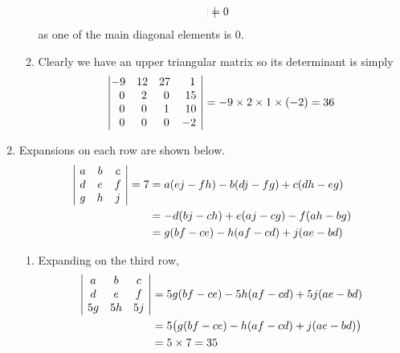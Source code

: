 \documentclass[12pt]{amsart}
\begin{document}
\begin{enumerate}
\begin{enumerate}
\begin{align}
\begin{vmatrix}
				\end{vmatrix} =0 \notag
			\end{align}
			as one of the main diagonal elements is $0$.
			\medskip
			\item Clearly we have an upper triangular matrix so its determinant is simply
			\begin{align}
				\begin{vmatrix}
					-9 &12 &27 &\text{ } \text{ }1 \text{ } \\
					\text{ } \text{ }0 &\text{ }2 &\text{ }0 &\text{ }15 \text{ } \\
					\text{ } \text{ }0 &\text{ }0 &\text{ }1 &\text{ }10 \text{ } \\
					\text{ } \text{ }0 &\text{ }0 &\text{ }0 &-2 \text{ }
				\end{vmatrix}=-9\times2\times1\times(-2)=36 \notag
			\end{align}
			
		\end{enumerate}
		
	\item Expansions on each row are shown below.
			\begin{align}
				\begin{vmatrix}
					\text{ }a &b &c \text{ } \\
					\text{ }d &e &f \text{ } \\
					\text{ }g &h &j \text{ }
				\end{vmatrix}=7
				&=a(ej-fh)-b(dj-fg)+c(dh-eg) \notag \\
				&=-d(bj-ch)+e(aj-cg)-f(ah-bg) \notag \\
				&=g(bf-ce)-h(af-cd)+j(ae-bd) \notag
			\end{align}

		\begin{enumerate}
		
			\item Expanding on the third row,
			\begin{align}
				\begin{vmatrix}
					\text{ }a &b &c \text{ } \\
					\text{ }d &e &f \text{ } \\
					\text{ }5g &5h &5j \text{ }
				\end{vmatrix}&=5g(bf-ce)-5h(af-cd)+5j(ae-bd) \notag \\
				&=5\big(g(bf-ce)-h(af-cd)+j(ae-bd)\big) \notag \\
				&=5\times7=35 \notag
			\end{align}
			

\end{enumerate}
\end{enumerate}
\end{document}
